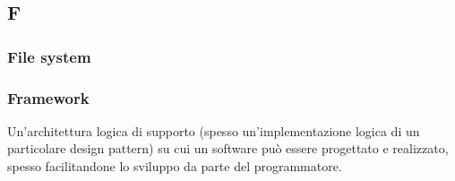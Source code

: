 \subsection*{\textbf{\hfill \Huge{F} \hfill}} 
\subsubsection*{File system}

\subsubsection*{Framework}
Un’architettura logica di supporto (spesso un’implementazione logica di un particolare design pattern) su cui un software può essere progettato e realizzato, spesso facilitandone lo sviluppo da parte del programmatore.
